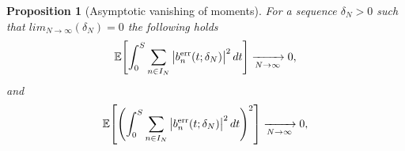 \documentclass[12pt,reqno]{amsart}
\theoremstyle{plain}
\newtheorem{prop}{Proposition}[section]
\theoremstyle{definition}
\theoremstyle{remark}
\begin{document}
\begin{prop}[Asymptotic vanishing of moments] \label{cor:L2-small}
For a sequence $\delta_N>0$ such that $lim_{N \rightarrow \infty} (\delta_N)=0$ the following holds
\begin{equation}\label{eq:L2-small-global}
\mathbb{E}\!\left[\int_0^S \sum_{n\in I_N}\big|b^{\mathrm{err}}_{n}(t ; \delta_N)\big|^2\,dt\right]
\xrightarrow[N\to\infty]{\ \\ \ } 0,
\end{equation}
and
\begin{equation}\label{eq:L2-small-global}
\mathbb{E}\!\left[ \left ( \int_0^S \sum_{n\in I_N}\big|b^{\mathrm{err}}_{n}(t ; \delta_N)\big|^2\,dt \right )^2 \right]
\xrightarrow[N\to\infty]{\ \\ \ } 0,
\end{equation}
\end{prop}
\end{document}
